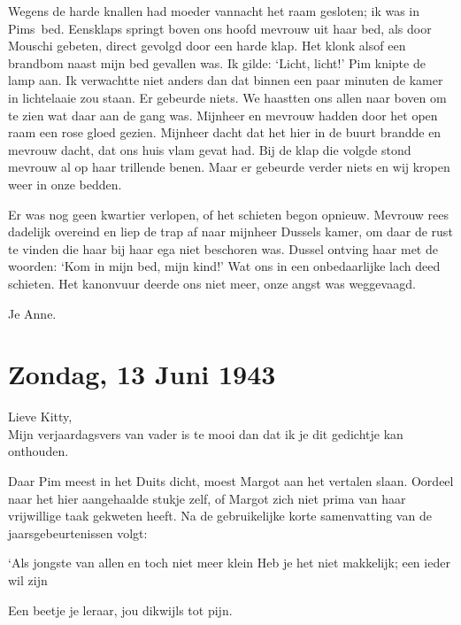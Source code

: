 \documentclass{book}
\begin{document}
Wegens de harde knallen had moeder vannacht het raam gesloten; ik was in
Pims~bed. Eensklaps springt boven ons hoofd mevrouw uit haar bed, als
door Mouschi gebeten, direct gevolgd door een harde klap. Het klonk
alsof een brandbom naast mijn bed gevallen was. Ik gilde: `Licht,
licht!' Pim knipte de lamp aan. Ik verwachtte niet anders dan dat binnen
een paar minuten de kamer in lichtelaaie zou staan. Er gebeurde niets.
We haastten ons allen naar boven om te zien wat daar aan de gang was.
Mijnheer en mevrouw hadden door het open raam een rose gloed gezien.
Mijnheer dacht dat het hier in de buurt brandde en mevrouw dacht, dat
ons huis vlam gevat had. Bij de klap die volgde stond mevrouw al op haar
trillende benen. Maar er gebeurde verder niets en wij kropen weer in
onze bedden.

Er was nog geen kwartier verlopen, of het schieten begon opnieuw.
Mevrouw rees dadelijk overeind en liep de trap af naar mijnheer Dussels
kamer, om daar de rust te vinden die haar bij haar ega niet beschoren
was. Dussel ontving haar met de woorden: `Kom in mijn bed, mijn kind!'
Wat ons in een onbedaarlijke lach deed schieten. Het kanonvuur deerde
ons niet meer, onze angst was weggevaagd.

Je Anne.

\chapter{Zondag, 13 Juni 1943}

Lieve Kitty,\\Mijn verjaardagsvers van vader is te mooi dan dat ik je
dit gedichtje kan onthouden.

Daar Pim meest in het Duits dicht, moest Margot aan het vertalen slaan.
Oordeel naar het hier aangehaalde stukje zelf, of Margot zich niet prima
van haar vrijwillige taak gekweten heeft. Na de gebruikelijke korte
samenvatting van de jaarsgebeurtenissen volgt:

`Als jongste van allen en toch niet meer klein Heb je het niet
makkelijk; een ieder wil zijn

Een beetje je leraar, jou dikwijls tot pijn.
\end{document}
